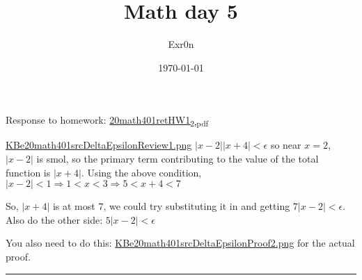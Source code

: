 \documentclass[letterpaper]{article}
\author{Exr0n}
\date{\today}
\title{Math day 5}
\renewcommand{\tableofcontents}{}
\begin{document}
\tableofcontents

Response to homework:
\href{20math401retHW1\_2.pdf.org}{20math401retHW1\textsubscript{2.pdf}}

\href{KBe20math401srcDeltaEpsilonReview1.png.org}{KBe20math401srcDeltaEpsilonReview1.png}
\(|x-2||x+4| < \epsilon\) so near \(x=2\), \(|x-2|\) is smol, so the
primary term contributing to the value of the total function is
\(|x+4|\). Using the above condition,
\(|x-2| < 1 \Rightarrow 1 < x < 3 \Rightarrow 5 < x+4 < 7\)

So, \(|x+4|\) is at most \(7\), we could try substituting it in and
getting \(7|x-2| < \epsilon\). Also do the other side:
\(5|x-2| < \epsilon\)

You also need to do this:
\href{KBe20math401srcDeltaEpsilonProof2.png.org}{KBe20math401srcDeltaEpsilonProof2.png}
for the actual proof.

\noindent\rule{\textwidth}{0.5pt}
\end{document}
